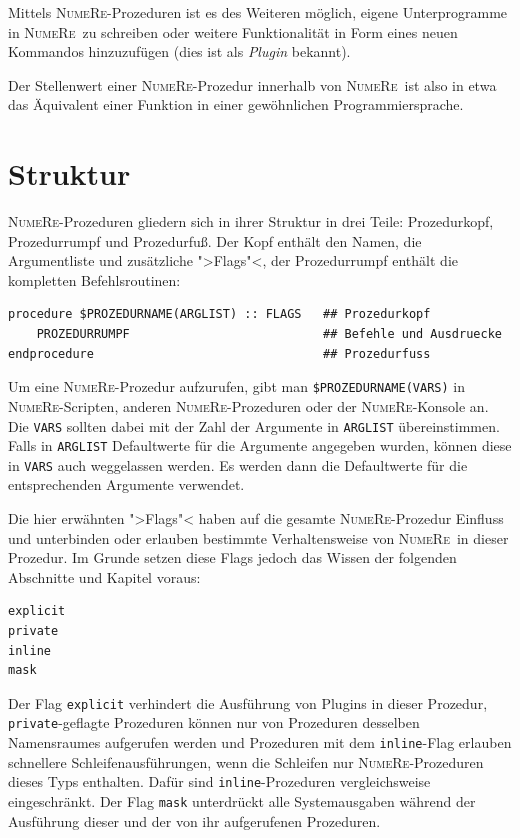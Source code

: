 \documentclass[DIV=14,headsepline,footsepline]{scrbook}
\newcommand{\NR}{\textsc{Nu\-me\-Re}}
\begin{document}
				Mittels \NR-Prozeduren ist es des Weiteren möglich, eigene Unterprogramme in \NR\ zu schreiben oder weitere Funktionalität in Form eines neuen Kommandos hinzuzufügen (dies ist als \emph{Plugin} bekannt).
				
				Der Stellenwert einer \NR-Prozedur innerhalb von \NR\ ist also in etwa das Äquivalent einer Funktion in einer gewöhnlichen Programmiersprache.
				
			\section{Struktur}
				\NR-Prozeduren gliedern sich in ihrer Struktur in drei Teile: Prozedurkopf, Prozedurrumpf und Prozedurfuß. Der Kopf enthält den Namen, die Argumentliste und zusätzliche ">Flags"<, der Prozedurrumpf enthält die kompletten Befehlsroutinen:
				\begin{lstlisting}
procedure $PROZEDURNAME(ARGLIST) :: FLAGS   ## Prozedurkopf
	PROZEDURRUMPF                           ## Befehle und Ausdruecke
endprocedure                                ## Prozedurfuss
				\end{lstlisting}
				Um eine \NR-Prozedur aufzurufen, gibt man \lstinline+$PROZEDURNAME(VARS)+ in \NR-Scrip\-ten, anderen \NR-Prozeduren oder der \NR-Konsole an. Die \lstinline+VARS+ sollten dabei mit der Zahl der Argumente in \lstinline+ARGLIST+ übereinstimmen. Falls in \lstinline+ARGLIST+ Defaultwerte für die Argumente angegeben wurden, können diese in \lstinline+VARS+ auch weggelassen werden. Es werden dann die Defaultwerte für die entsprechenden Argumente verwendet.
				
				Die hier erwähnten ">Flags"< haben auf die gesamte \NR-Prozedur Einfluss und unterbinden oder erlauben bestimmte Verhaltensweise von \NR\ in dieser Prozedur. Im Grunde setzen diese Flags jedoch das Wissen der folgenden Abschnitte und Kapitel voraus:
				\begin{lstlisting}
explicit
private
inline
mask
				\end{lstlisting}
				Der Flag \lstinline+explicit+ verhindert die Ausführung von Plugins in dieser Prozedur, \lstinline+private+-geflagte Prozeduren können nur von Prozeduren desselben Namensraumes aufgerufen werden und Prozeduren mit dem \lstinline+inline+-Flag erlauben schnellere Schleifenausführungen, wenn die Schleifen nur \NR-Pro\-ze\-du\-ren dieses Typs enthalten. Dafür sind \lstinline+inline+-Pro\-ze\-du\-ren vergleichsweise eingeschränkt. Der Flag \lstinline+mask+ unterdrückt alle Systemausgaben während der Ausführung dieser und der von ihr aufgerufenen Prozeduren.
				
\end{document}
